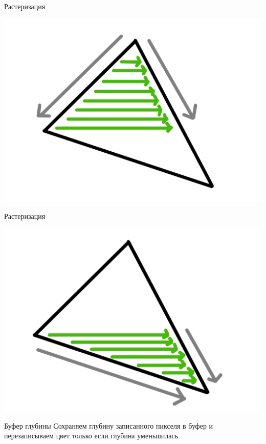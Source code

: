 \documentclass{beamer}
\begin{document}
\begin{frame}{Растеризация}
\begin{center}
\includegraphics[width=0.8 \linewidth]{algo-1.png}
\end{center}
\end{frame}

\begin{frame}{Растеризация}
\begin{center}
\includegraphics[width=0.8 \linewidth]{algo-2.png}
\end{center}
\end{frame}

\begin{frame}{Буфер глубины}
Сохраняем глубину записанного пикселя в буфер и перезаписываем 
цвет только если глубина уменьшилась. 
\end{frame}
\end{document}

